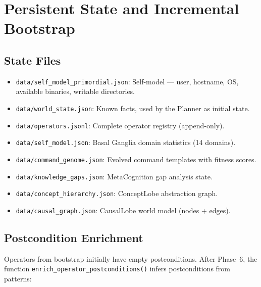 \documentclass[12pt,a4paper]{report}
\begin{document}
\chapter{Persistent State and Incremental Bootstrap}

\section{State Files}
\begin{itemize}
    \item \texttt{data/self\_model\_primordial.json}: Self-model --- user, hostname, OS, available binaries, writable directories.
    \item \texttt{data/world\_state.json}: Known facts, used by the Planner as initial state.
    \item \texttt{data/operators.jsonl}: Complete operator registry (append-only).
    \item \texttt{data/self\_model.json}: Basal Ganglia domain statistics (14 domains).
    \item \texttt{data/command\_genome.json}: Evolved command templates with fitness scores.
    \item \texttt{data/knowledge\_gaps.json}: MetaCognition gap analysis state.
    \item \texttt{data/concept\_hierarchy.json}: ConceptLobe abstraction graph.
    \item \texttt{data/causal\_graph.json}: CausalLobe world model (nodes + edges).
\end{itemize}

\section{Postcondition Enrichment}
Operators from bootstrap initially have empty postconditions. After Phase~6, the function \texttt{enrich\_operator\_post\-con\-di\-tions()} infers postconditions from patterns:
\end{document}

